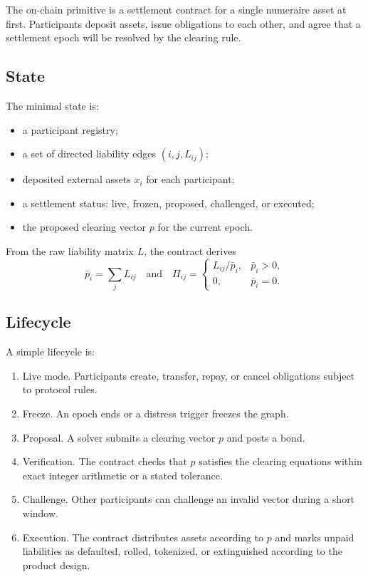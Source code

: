 \documentclass[11pt,oneside]{article}
\newcommand{\barp}{\bar p}
\begin{document}
The on-chain primitive is a settlement contract for a single numeraire asset at
first. Participants deposit assets, issue obligations to each other, and agree
that a settlement epoch will be resolved by the clearing rule.

\subsection{State}

The minimal state is:

\begin{itemize}[leftmargin=1.5em]
  \item a participant registry;
  \item a set of directed liability edges $(i,j,L_{ij})$;
  \item deposited external assets $x_i$ for each participant;
  \item a settlement status: live, frozen, proposed, challenged, or executed;
  \item the proposed clearing vector $p$ for the current epoch.
\end{itemize}

From the raw liability matrix $L$, the contract derives
\[
  \barp_i=\sum_j L_{ij}
  \quad\text{and}\quad
  \Pi_{ij} =
  \begin{cases}
    L_{ij}/\barp_i, & \barp_i>0,\\
    0, & \barp_i=0.
  \end{cases}
\]

\subsection{Lifecycle}

A simple lifecycle is:

\begin{enumerate}[leftmargin=1.5em]
  \item Live mode. Participants create, transfer, repay, or cancel obligations
  subject to protocol rules.
  \item Freeze. An epoch ends or a distress trigger freezes the graph.
  \item Proposal. A solver submits a clearing vector $p$ and posts a bond.
  \item Verification. The contract checks that $p$ satisfies the clearing
  equations within exact integer arithmetic or a stated tolerance.
  \item Challenge. Other participants can challenge an invalid vector during a
  short window.
  \item Execution. The contract distributes assets according to $p$ and marks
  unpaid liabilities as defaulted, rolled, tokenized, or extinguished according
  to the product design.
\end{enumerate}
\end{document}
